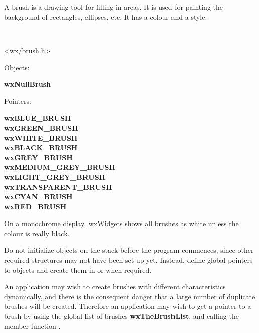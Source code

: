 
\section{}\label{wxbrush}

A brush is a drawing tool for filling in areas. It is used for painting
the background of rectangles, ellipses, etc. It has a colour and a
style.


\\


<wx/brush.h>




Objects:

{\bf wxNullBrush}

Pointers:

{\bf wxBLUE\_BRUSH\\
wxGREEN\_BRUSH\\
wxWHITE\_BRUSH\\
wxBLACK\_BRUSH\\
wxGREY\_BRUSH\\
wxMEDIUM\_GREY\_BRUSH\\
wxLIGHT\_GREY\_BRUSH\\
wxTRANSPARENT\_BRUSH\\
wxCYAN\_BRUSH\\
wxRED\_BRUSH}


On a monochrome display, wxWidgets shows
all brushes as white unless the colour is really black.

Do not initialize objects on the stack before the program commences,
since other required structures may not have been set up yet. Instead,
define global pointers to objects and create them in  or
when required.

An application may wish to create brushes with different
characteristics dynamically, and there is the consequent danger that a
large number of duplicate brushes will be created. Therefore an
application may wish to get a pointer to a brush by using the global
list of brushes {\bf wxTheBrushList}, and calling the member function
.

